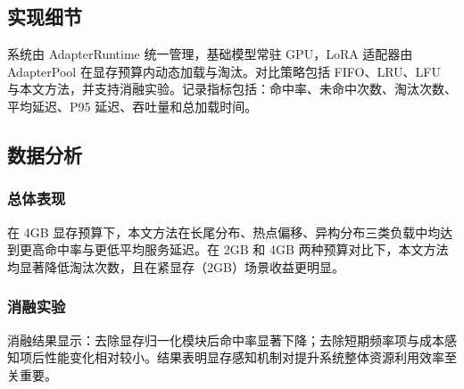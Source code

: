 \subsection{实现细节}
系统由 AdapterRuntime 统一管理，基础模型常驻 GPU，LoRA 适配器由 AdapterPool 在显存预算内动态加载与淘汰。对比策略包括 FIFO、LRU、LFU 与本文方法，并支持消融实验。记录指标包括：命中率、未命中次数、淘汰次数、平均延迟、P95 延迟、吞吐量和总加载时间。

\subsection{数据分析}
\subsubsection{总体表现}
在 4GB 显存预算下，本文方法在长尾分布、热点偏移、异构分布三类负载中均达到更高命中率与更低平均服务延迟。在 2GB 和 4GB 两种预算对比下，本文方法均显著降低淘汰次数，且在紧显存（2GB）场景收益更明显。

\subsubsection{消融实验}
消融结果显示：去除显存归一化模块后命中率显著下降；去除短期频率项与成本感知项后性能变化相对较小。结果表明显存感知机制对提升系统整体资源利用效率至关重要。
